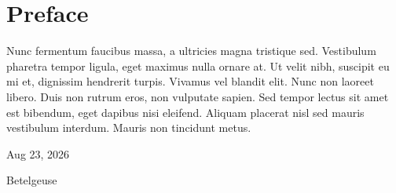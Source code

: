 

\chapter*{Preface} %

Nunc fermentum faucibus massa, a ultricies magna tristique sed. Vestibulum pharetra tempor ligula, eget maximus nulla ornare at. Ut velit nibh, suscipit eu mi et, dignissim hendrerit turpis. Vivamus vel blandit elit. Nunc non laoreet libero. Duis non rutrum eros, non vulputate sapien. Sed tempor lectus sit amet est bibendum, eget dapibus nisi eleifend. Aliquam placerat nisl sed mauris vestibulum interdum. Mauris non tincidunt metus. 

\hfill Aug 23, 2026

\hfill Betelgeuse
